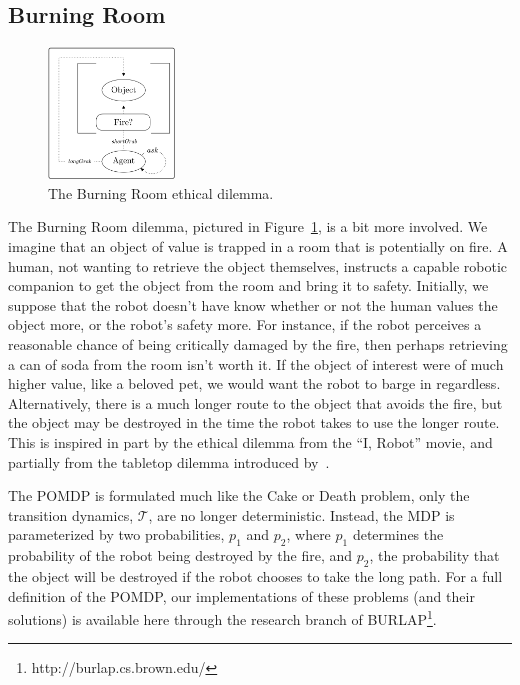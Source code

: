 \documentclass[11pt]{article}
\begin{document}
\subsection{Burning Room}

\begin{figure}
\centering
\includegraphics[width=0.30\textwidth]{figures/burning_room.png}
\caption{The Burning Room ethical dilemma.}
\label{fig:burning_room}
\end{figure}

The Burning Room dilemma, pictured in Figure~\ref{fig:burning_room}, is a bit more involved. We imagine that an object of value is trapped in a room that is potentially on fire. A human, not wanting to retrieve the object themselves, instructs a capable robotic companion to get the object from the room and bring it to safety. Initially, we suppose that the robot doesn't have know whether or not the human values the object more, or the robot's safety more. For instance, if the robot perceives a reasonable chance of being critically damaged by the fire, then perhaps retrieving a can of soda from the room isn't worth it. If the object of interest were of much higher value, like a beloved pet, we would want the robot to barge in regardless. Alternatively, there is a much longer route to the object that avoids the fire, but the object may be destroyed in the time the robot takes to use the longer route. This is inspired in part by the ethical dilemma from the ``I, Robot'' movie, and partially from the tabletop dilemma introduced by~\cite{briggs2015sorry}.

The POMDP is formulated much like the Cake or Death problem, only the transition dynamics, $\mathcal{T}$, are no longer deterministic. Instead, the MDP is parameterized by two probabilities, $p_1$ and $p_2$, where $p_1$ determines the probability of the robot being destroyed by the fire, and $p_2$, the probability that the object will be destroyed if the robot chooses to take the long path. For a full definition of the POMDP, our implementations of these problems (and their solutions) is available here through the research branch of BURLAP\footnote{http://burlap.cs.brown.edu/}.
\end{document}
